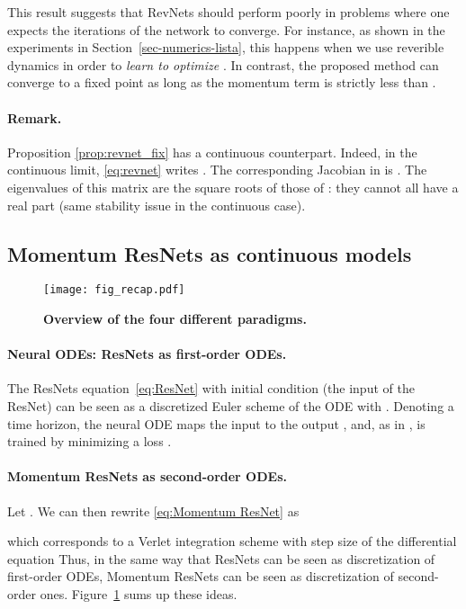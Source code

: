 \documentclass{article}
\begin{document}
This result suggests that RevNets should perform poorly in problems where one expects the iterations of the network to converge.
For instance, as shown in the experiments in Section~\ref{sec-numerics-lista}, this happens when we use reverible dynamics in order to \emph{learn to optimize} \citep{10.5555/3045118.3045343}.
In contrast, the proposed method can converge to a fixed point as long as the momentum term  is strictly less than .
\vspace{-1em}
\paragraph{Remark.} Proposition \ref{prop:revnet_fix} has a continuous counterpart. Indeed, in the continuous limit, \eqref{eq:revnet} writes . The corresponding Jacobian in  is . The eigenvalues of this matrix are the square roots of those of : they cannot all have a real part  (same stability issue in the continuous case).

\subsection{Momentum ResNets as continuous models}

\begin{figure}[H]
\texttt{[image: fig\_recap.pdf]} 
\caption{\textbf{Overview of the four different paradigms.} }\label{fig:recap}
\vspace{-1em}
\end{figure}

\paragraph{Neural ODEs: ResNets as first-order ODEs.}
The ResNets equation~\eqref{eq:ResNet} with initial condition  (the input of the ResNet) can be seen as a discretized Euler scheme of the ODE  with .
Denoting  a time horizon, the neural ODE maps the input  to the output , and, as in \citet{chen2018neural}, is trained by minimizing a loss . 

\paragraph{Momentum ResNets as second-order ODEs.}

Let . We can then rewrite \eqref{eq:Momentum ResNet} as 

which corresponds to a Verlet integration scheme \citep{Hairer:1250576} with step size  of the differential equation 
Thus, in the same way that ResNets can be seen as discretization of first-order ODEs, Momentum ResNets can be seen as discretization of second-order ones. 
Figure~\ref{fig:recap} sums up these ideas.
\end{document}
